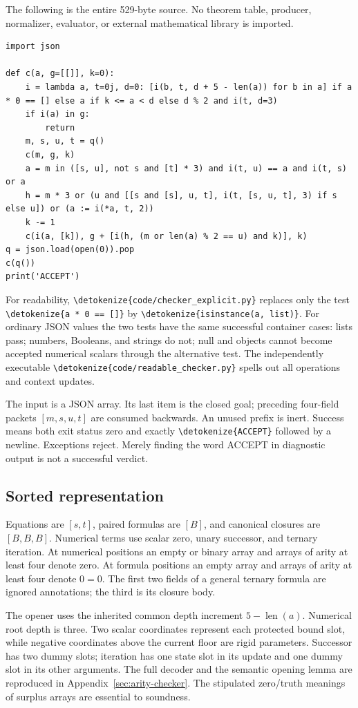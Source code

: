 \documentclass[11pt,letterpaper]{article}
\theoremstyle{definition}\newtheorem{definition}[theorem]{Definition}
\theoremstyle{remark}\newtheorem{remark}[theorem]{Remark}
\newcommand{\file}[1]{\expandafter\nolinkurl\expandafter{\detokenize{#1}}}
\begin{document}
The following is the entire 529-byte source. No theorem table, producer,
normalizer, evaluator, or external mathematical library is imported.
\begin{lstlisting}
import json

def c(a, g=[[]], k=0):
    i = lambda a, t=0j, d=0: [i(b, t, d + 5 - len(a)) for b in a] if a * 0 == [] else a if k <= a < d else d % 2 and i(t, d=3)
    if i(a) in g:
        return
    m, s, u, t = q()
    c(m, g, k)
    a = m in ([s, u], not s and [t] * 3) and i(t, u) == a and i(t, s) or a
    h = m * 3 or (u and [[s and [s], u, t], i(t, [s, u, t], 3) if s else u]) or (a := i(*a, t, 2))
    k -= 1
    c(i(a, [k]), g + [i(h, (m or len(a) % 2 == u) and k)], k)
q = json.load(open(0)).pop
c(q())
print('ACCEPT')
\end{lstlisting}

For readability, \file{code/checker_explicit.py} replaces only the test
\file{a * 0 == []} by \file{isinstance(a, list)}. For ordinary JSON values
the two tests have the same successful container cases: lists pass; numbers,
Booleans, and strings do not; null and objects cannot become accepted
numerical scalars through the alternative test. The independently executable
\file{code/readable_checker.py} spells out all operations and context updates.

The input is a JSON array. Its last item is the closed goal; preceding
four-field packets $[m,s,u,t]$ are consumed backwards. An unused prefix is
inert. Success means both exit status zero and exactly \file{ACCEPT} followed
by a newline. Exceptions reject. Merely finding the word ACCEPT in diagnostic
output is not a successful verdict.

\subsection{Sorted representation}

Equations are $[s,t]$, paired formulas are $[B]$, and canonical closures
are $[B,B,B]$. Numerical terms use scalar zero, unary successor, and ternary
iteration. At numerical positions an empty or binary array and arrays of
arity at least four denote zero. At formula positions an empty array and
arrays of arity at least four denote $0=0$. The first two fields of a general
ternary formula are ignored annotations; the third is its closure body.

The opener uses the inherited common depth increment
$5-\operatorname{len}(a)$. Numerical root depth is three. Two scalar
coordinates represent each protected bound slot, while negative coordinates
above the current floor are rigid parameters. Successor has two dummy slots;
iteration has one state slot in its update and one dummy slot in its other
arguments. The full decoder and the semantic opening lemma are reproduced
in Appendix~\ref{sec:arity-checker}. The stipulated zero/truth meanings of
surplus arrays are essential to soundness.
\end{document}

